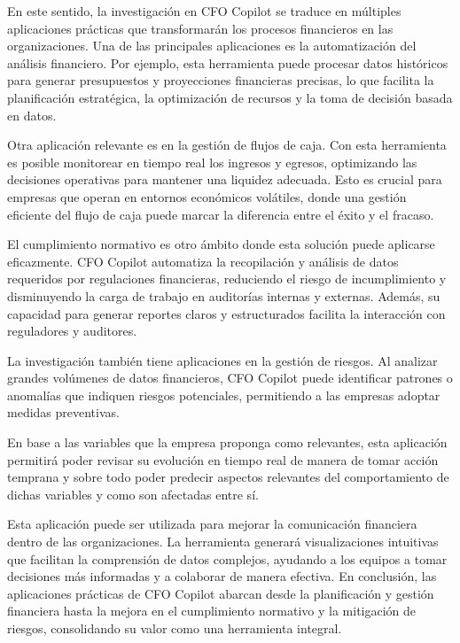 \documentclass[12pt,letterpaper,oneside]{report}
\renewcommand{\_}{\UnderscoreOriginal\allowbreak}
\begin{document}
En este sentido, la investigación en CFO Copilot se traduce en múltiples aplicaciones prácticas que transformarán los procesos financieros en las organizaciones. Una de las principales aplicaciones es la automatización del análisis financiero. Por ejemplo, esta herramienta puede procesar datos históricos para generar presupuestos y proyecciones financieras precisas, lo que facilita la planificación estratégica, la optimización de recursos y la toma de decisión basada en datos. \parencite{MicrosoftKurpad2024}

Otra aplicación relevante es en la gestión de flujos de caja. Con esta herramienta es posible monitorear en tiempo real los ingresos y egresos, optimizando las decisiones operativas para mantener una liquidez adecuada. Esto es crucial para empresas que operan en entornos económicos volátiles, donde una gestión eficiente del flujo de caja puede marcar la diferencia entre el éxito y el fracaso. \parencite{Snchez-Caguana2024}

El cumplimiento normativo es otro ámbito donde esta solución puede aplicarse eficazmente. CFO Copilot automatiza la recopilación y análisis de datos requeridos por regulaciones financieras, reduciendo el riesgo de incumplimiento y disminuyendo la carga de trabajo en auditorías internas y externas. Además, su capacidad para generar reportes claros y estructurados facilita la interacción con reguladores y auditores.

La investigación también tiene aplicaciones en la gestión de riesgos. Al analizar grandes volúmenes de datos financieros, CFO Copilot puede identificar patrones o anomalías que indiquen riesgos potenciales, permitiendo a las empresas adoptar medidas preventivas. \parencite{HermitanoCastro2022}

En base a las variables que la empresa proponga como relevantes, esta aplicación permitirá poder revisar su evolución en tiempo real de manera de tomar acción temprana y sobre todo poder predecir aspectos relevantes del comportamiento de dichas variables y como son afectadas entre sí.

Esta aplicación puede ser utilizada para mejorar la comunicación financiera dentro de las organizaciones. La herramienta generará visualizaciones intuitivas que facilitan la comprensión de datos complejos, ayudando a los equipos a tomar decisiones más informadas y a colaborar de manera efectiva. En conclusión, las aplicaciones prácticas de CFO Copilot abarcan desde la planificación y gestión financiera hasta la mejora en el cumplimiento normativo y la mitigación de riesgos, consolidando su valor como una herramienta integral.
\end{document}
